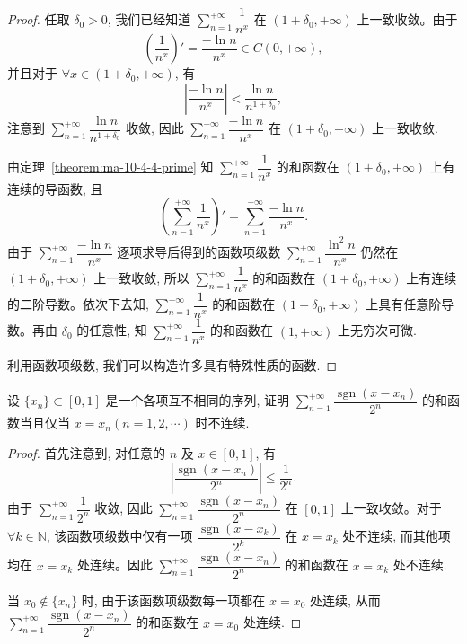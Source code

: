 \begin{proof}
任取 $\delta_0>0$, 我们已经知道 $\sum\limits_{n=1}^{+\infty}\dfrac1{n^x}$ 在 $(1+\delta_0,+\infty)$ 上一致收敛。由于
\[
  \left(\frac1{n^x}\right)'=\frac{-\ln n}{n^x}\in C(0,+\infty),
\]
并且对于 $\forall x\in(1+\delta_0,+\infty)$, 有
\[
  \left|\frac{-\ln n}{n^x}\right|<\frac{\ln n}{n^{1+\delta_0}},
\]
注意到 $\sum\limits_{n=1}^{+\infty}\dfrac{\ln n}{n^{1+\delta_0}}$ 收敛, 因此 $\sum\limits_{n=1}^{+\infty}\dfrac{-\ln n}{n^x}$ 在 $(1+\delta_0,+\infty)$ 上一致收敛.

由定理~\ref{theorem:ma-10-4-4-prime} 知 $\sum\limits_{n=1}^{+\infty}\dfrac1{n^x}$ 的和函数在 $(1+\delta_0,+\infty)$ 上有连续的导函数, 且
\[
  \left(\sum_{n=1}^{+\infty}\frac1{n^x}\right)'
  =\sum_{n=1}^{+\infty}\frac{-\ln n}{n^x}.
\]
由于 $\sum\limits_{n=1}^{+\infty}\dfrac{-\ln n}{n^x}$ 逐项求导后得到的函数项级数 $\sum\limits_{n=1}^{+\infty}\dfrac{\ln^2 n}{n^x}$ 仍然在 $(1+\delta_0,+\infty)$ 上一致收敛, 所以 $\sum\limits_{n=1}^{+\infty}\dfrac1{n^x}$ 的和函数在 $(1+\delta_0,+\infty)$ 上有连续的二阶导数。依次下去知, $\sum\limits_{n=1}^{+\infty}\dfrac1{n^x}$ 的和函数在 $(1+\delta_0,+\infty)$ 上具有任意阶导数。再由 $\delta_0$ 的任意性, 知 $\sum\limits_{n=1}^{+\infty}\dfrac1{n^x}$ 的和函数在 $(1,+\infty)$ 上无穷次可微.

利用函数项级数, 我们可以构造许多具有特殊性质的函数.
\end{proof}


\begin{example}\label{example:ma-10-4-6}
设 $\{x_n\}\subset[0,1]$ 是一个各项互不相同的序列, 证明 $\sum\limits_{n=1}^{+\infty}\dfrac{\operatorname{sgn}(x-x_n)}{2^n}$ 的和函数当且仅当 $x=x_n(n=1,2,\cdots)$ 时不连续.
\end{example}


\begin{proof}
首先注意到, 对任意的 $n$ 及 $x\in[0,1]$, 有
\[
  \left|\frac{\operatorname{sgn}(x-x_n)}{2^n}\right|\leq\frac1{2^n}.
\]
由于 $\sum\limits_{n=1}^{+\infty}\dfrac1{2^n}$ 收敛, 因此 $\sum\limits_{n=1}^{+\infty}\dfrac{\operatorname{sgn}(x-x_n)}{2^n}$ 在 $[0,1]$ 上一致收敛。对于 $\forall k\in\mathbb N$, 该函数项级数中仅有一项 $\dfrac{\operatorname{sgn}(x-x_k)}{2^k}$ 在 $x=x_k$ 处不连续, 而其他项均在 $x=x_k$ 处连续。因此 $\sum\limits_{n=1}^{+\infty}\dfrac{\operatorname{sgn}(x-x_n)}{2^n}$ 的和函数在 $x=x_k$ 处不连续.

当 $x_0\notin\{x_n\}$ 时, 由于该函数项级数每一项都在 $x=x_0$ 处连续, 从而 $\sum\limits_{n=1}^{+\infty}\dfrac{\operatorname{sgn}(x-x_n)}{2^n}$ 的和函数在 $x=x_0$ 处连续.
\end{proof}


